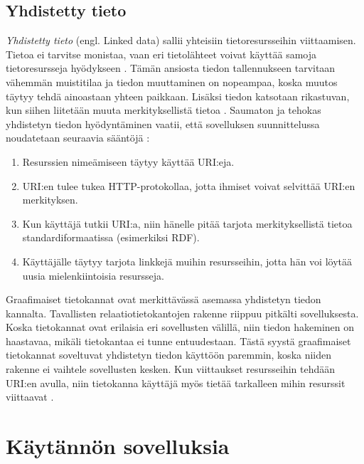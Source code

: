\documentclass[finnish, 12pt, a4paper, elec, utf8, pdfa, online]{aaltothesis}
\begin{document}
{\clearpage

\subsection{Yhdistetty tieto}

\textit{Yhdistetty tieto} (engl. Linked data) sallii yhteisiin tietoresursseihin viittaamisen. Tietoa ei tarvitse monistaa, vaan eri tietolähteet voivat käyttää samoja tietoresursseja hyödykseen \cite{linked_data_finlad}. Tämän ansiosta tiedon tallennukseen tarvitaan vähemmän muistitilaa ja tiedon muuttaminen on nopeampaa, koska muutos täytyy tehdä ainoastaan yhteen paikkaan. Lisäksi tiedon katsotaan rikastuvan, kun siihen liitetään muuta merkityksellistä tietoa \cite{linked_data_finlad}. Saumaton ja tehokas yhdistetyn tiedon hyödyntäminen vaatii, että sovelluksen suunnittelussa noudatetaan seuraavia sääntöjä \cite{cambridge_linked}:
\begin{enumerate}
\item Resurssien nimeämiseen täytyy käyttää URI:eja.
\item URI:en tulee tukea HTTP-protokollaa, jotta ihmiset voivat selvittää URI:en merkityksen.
\item Kun käyttäjä tutkii URI:a, niin hänelle pitää tarjota merkityksellistä tietoa standardiformaatissa (esimerkiksi RDF).
\item Käyttäjälle täytyy tarjota linkkejä muihin resursseihin, jotta hän voi löytää uusia mielenkiintoisia resursseja.
\end{enumerate}
\vspace{0.5cm}

Graafimaiset tietokannat ovat merkittävässä asemassa yhdistetyn tiedon kannalta. Tavallisten relaatiotietokantojen rakenne riippuu pitkälti sovelluksesta. Koska tietokannat ovat erilaisia eri sovellusten välillä, niin tiedon hakeminen on haastavaa, mikäli tietokantaa ei tunne entuudestaan. Tästä syystä graafimaiset tietokannat soveltuvat yhdistetyn tiedon käyttöön paremmin, koska niiden rakenne ei vaihtele sovellusten kesken. Kun viittaukset resursseihin tehdään URI:en avulla, niin tietokanna käyttäjä myös tietää tarkalleen mihin resurssit viittaavat \cite{cambridge_linked}.

\clearpage
\section{Käytännön sovelluksia}

}
\end{document}
